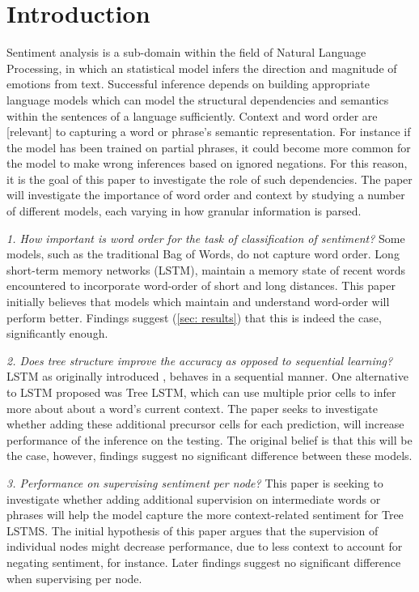 \section{Introduction}
\label{sec: intro}
Sentiment analysis is a sub-domain within the field of Natural Language
Processing, in which an statistical model infers the direction and magnitude of
emotions from text. Successful inference depends on building appropriate
language models which can model the structural dependencies and semantics within
the sentences of a language sufficiently. Context and word order are [relevant]
to capturing a word or phrase's semantic representation. For instance if the
model has been trained on partial phrases, it could become more common for the
model to make wrong inferences based on ignored negations. For this reason, it
is the goal of this paper to investigate the role of such dependencies. The
paper will investigate the importance of word order and context by studying a
number of different models, each varying in how granular information is parsed.

    \textit{1. How important is word order for the task of classification of
    sentiment?} Some models, such as the traditional Bag of Words, do not
    capture word order. Long short-term memory networks (LSTM), maintain a
    memory state of recent words encountered to incorporate word-order of short
    and long distances. This paper initially believes that models which maintain
    and understand word-order will perform better. Findings suggest (\ref{sec:
    results}) that this is indeed the case, significantly enough.

    \textit{2. Does tree structure improve the accuracy as opposed to
    sequential learning?} LSTM as originally
    introduced \cite{hochreiter1997long}, behaves in a sequential manner. One
    alternative to LSTM proposed was Tree LSTM, which can use multiple prior
    cells to infer more about about a word's current context. The paper seeks to
    investigate whether adding these additional precursor cells for each
    prediction, will increase performance of the inference on the testing. The
    original belief is that this will be the case, however, findings suggest no
    significant difference between these models.
    
    \textit{3. Performance on supervising sentiment per node?}
    This paper is seeking to investigate whether adding additional supervision
    on intermediate words or phrases will help the model capture the more
    context-related sentiment for Tree LSTMS. The initial hypothesis of this
    paper argues that the supervision of individual nodes might decrease
    performance, due to less context to account for negating sentiment, for
    instance. Later findings suggest no significant difference when supervising
    per node.

